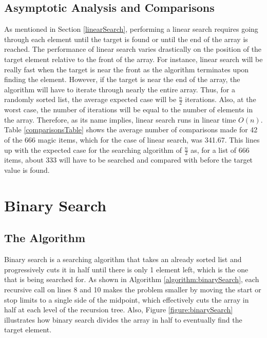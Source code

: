 \documentclass[letterpaper, 10pt,DIV=13]{scrartcl}
\numberwithin{equation}{section} %
\numberwithin{figure}{section} %
\numberwithin{table}{section} %
\begin{document}
\subsection{Asymptotic Analysis and Comparisons}
As mentioned in Section \ref{linearSearch}, performing a linear search requires going through each element until the target is found or until the end of the array is reached. The performance of linear search varies drastically on the position of the target element relative to the front of the array. For instance, linear search will be really fast when the target is near the front as the algorithm terminates upon finding the element. However, if the target is near the end of the array, the algorithm will have to iterate through nearly the entire array. Thus, for a randomly sorted list, the average expected case will be $\frac{n}{2}$ iterations. Also, at the worst case, the number of iterations will be equal to the number of elements in the array. Therefore, as its name implies, linear search runs in linear time $O(n)$. Table \ref{comparisonsTable} shows the average number of comparisons made for 42 of the 666 magic items, which for the case of linear search, was 341.67. This lines up with the expected case for the searching algorithm of $\frac{n}{2}$ as, for a list of 666 items, about 333 will have to be searched and compared with before the target value is found.

\section{Binary Search}
\subsection{The Algorithm}\label{binarySearch}
Binary search is a searching algorithm that takes an already sorted list and progressively cuts it in half until there is only 1 element left, which is the one that is being searched for. As shown in Algorithm \ref{algorithm:binarySearch}, each recursive call on lines 8 and 10 makes the problem smaller by moving the start or stop limits to a single side of the midpoint, which effectively cuts the array in half at each level of the recursion tree. Also, Figure \ref{figure:binarySearch} illustrates how binary search divides the array in half to eventually find the target element.
\end{document}
